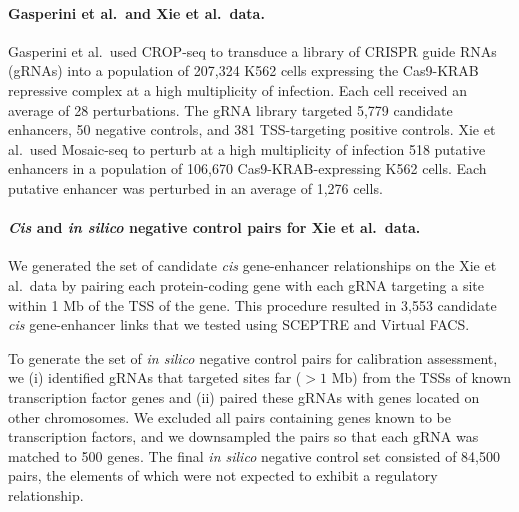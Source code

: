 \documentclass{article}
\begin{document}
\paragraph{Gasperini et al.\ and Xie et al.\ data.}
Gasperini et al.\ used CROP-seq\cite{Datlinger2017,Hill2018} to transduce a library of CRISPR guide RNAs (gRNAs) into a population of 207,324 K562 cells expressing the Cas9-KRAB repressive complex at a high multiplicity of infection. Each cell received an average of 28 perturbations. The gRNA library targeted 5,779 candidate enhancers, 50 negative controls, and 381 TSS-targeting positive controls. Xie et al.\ used Mosaic-seq\cite{Xie2019,Xie2017} to perturb at a high multiplicity of infection 518 putative enhancers in a population of 106,670 Cas9-KRAB-expressing K562 cells. Each putative enhancer was perturbed in an average of 1,276 cells.
\paragraph{\textit{Cis} and \textit{in silico} negative control pairs for Xie et al.\ data.} We generated the set of candidate \textit{cis} gene-enhancer relationships on the Xie et al.\ data by pairing each protein-coding gene with each gRNA targeting a site within 1 Mb of the TSS of the gene. This procedure resulted in 3,553 candidate \textit{cis} gene-enhancer links that we tested using SCEPTRE and Virtual FACS.

To generate the set of \textit{in silico} negative control pairs for calibration assessment, we (i) identified gRNAs that targeted sites far ($>1$ Mb) from the TSSs of known transcription factor genes and (ii) paired these gRNAs with genes located on other chromosomes. We excluded all pairs containing genes known to be transcription factors, and we downsampled the pairs so that each gRNA was matched to 500 genes. The final \textit{in silico} negative control set consisted of 84,500 pairs, the elements of which were not expected to exhibit a regulatory relationship.
\end{document}
